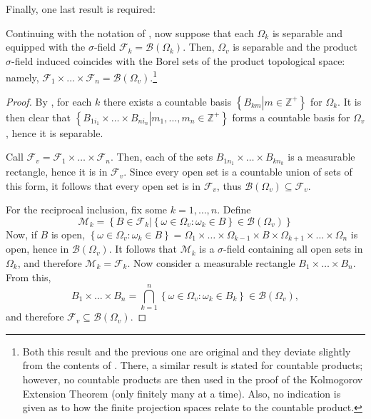 Finally, one last result is required:
\begin{lemm}\label{lemma:Borel sets in separable spaces}
		Continuing with the notation of , now suppose that each \(\Omega_k\) is separable and equipped with the \(\sigma\)-field \(\mathcal{F}_k=\mathscr{B}\left(\Omega_k\right)\). Then, \(\Omega_v\) is separable and the product \(\sigma\)-field induced coincides with the Borel sets of the product topological space: namely, \(\mathcal{F}_{1}\times \dots \times \mathcal{F}_{n}=\mathscr{B}\left(\Omega_v\right)\).\footnote{Both this result and the previous one are original and they deviate slightly from the contents of \cite{ash1972real}. There, a similar result is stated for countable products; however, no countable products are then used in the proof of the Kolmogorov Extension Theorem (only finitely many at a time). Also, no indication is given as to how the finite projection spaces relate to the countable product.}
\end{lemm}
\begin{proof}
		By , for each \(k\) there exists a countable basis \(\left\{B_{km}\left|m\in\mathbb{Z}^+\right.\right\}\) for \(\Omega_k\). It is then clear that \(\left\{B_{1i_1}\times\dots\times B_{ni_n}\left|m_1,\dots,m_n\in\mathbb{Z}^+\right.\right\}\) forms a countable basis for \(\Omega_v\), hence it is separable.

		Call \(\mathcal{F}_v=\mathcal{F}_{1}\times\dots\times\mathcal{F}_{n}\). Then, each of the sets \(B_{1n_1}\times\dots\times B_{kn_k}\) is a measurable rectangle, hence it is in \(\mathcal{F}_v\). Since every open set is a countable union of sets of this form, it follows that every open set is in \(\mathcal{F}_v\), thus \(\mathscr{B}\left(\Omega_v\right)\subseteq\mathcal{F}_v\).

		For the reciprocal inclusion, fix some \(k=1,\dots,n\). Define  
\[
		\mathcal{M}_k=\left\{\left.B\in\mathcal{F}_k\right|\left\{\omega\in\Omega_v\colon\omega_k\in B\right\}\in\mathscr{B}\left(\Omega_v\right)\right\}
\]
		Now, if \(B\) is open, \(\left\{\omega\in\Omega_v\colon\omega_k\in B\right\}=\Omega_1\times\dots\times\Omega_{k-1}\times B\times\Omega_{k+1}\times\dots\times\Omega_n\) is open, hence in \(\mathscr{B}\left(\Omega_v\right)\). It follows that \(\mathcal{M}_k\) is a \(\sigma\)-field containing all open sets in \(\Omega_k\), and therefore \(\mathcal{M}_k=\mathcal{F}_k\). Now consider a measurable rectangle \(B_1\times\dots\times B_n\). From this,
		\[
				B_1\times\dots\times B_n=\bigcap_{k=1}^n\left\{\omega\in\Omega_v\colon \omega_k\in B_k\right\}\in\mathscr{B}\left(\Omega_v\right)
		,\]
		and therefore \(\mathcal{F}_v\subseteq\mathscr{B}\left(\Omega_v\right)\).
\end{proof}

